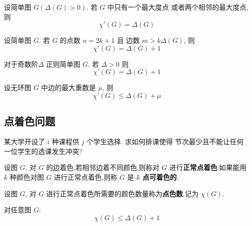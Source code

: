\begin{definition}
    设简单图 \(G(\Delta(G) > 0)\). 若 \(G\) 中只有一个最大度点
    或者两个相邻的最大度点, 则
    \[\chi'(G) = \Delta(G)\]
\end{definition}

\begin{definition}
    设简单图 \(G\). 若 \(G\) 的点数 \(n = 2k+1\) 且
    边数 \(m > k \Delta(G)\), 则
    \[\chi'(G) = \Delta(G) + 1\]
\end{definition}

\begin{definition}
    对于奇数阶\(\Delta\) 正则简单图 \(G\). 若 \(\Delta > 0\) 则
    \[\chi'(G) = \Delta(G) + 1\]
\end{definition}

\begin{definition}[Vizing]
    设无环图 \(G\) 中边的最大重数是 \(\mu\), 则
    \[\chi'(G) \le \Delta(G) + \mu\]
\end{definition}

\subsection{点着色问题}

\begin{example}[课程安排问题]
    某大学开设了 \(i\) 种课程供 \(j\) 个学生选择. 求如何排课使得
    节次最少且不能让任何一位学生的选课发生冲突?
\end{example}

\begin{definition}[正常点着色]
    设图 $G$, 对 $G$ 的边着色,若相邻边着不同颜色,则称对 
    $G$ 进行\textbf{正常点着色}.如果能用 
    $k$ 种颜色对图 $G$ 进行正常点着色,则称 $G$ 是 \textbf{$k$ 点可着色的}.
\end{definition}

\begin{definition}[点色数]
    设图 $G$, 对 $G$ 进行正常点着色所需要的颜色数量称为\textbf{点色数}.记为 $\chi(G)$.
\end{definition}

\begin{theorem}
    对任意图 \(G\):
    \[\chi(G) \le \Delta(G) + 1\]
\end{theorem}